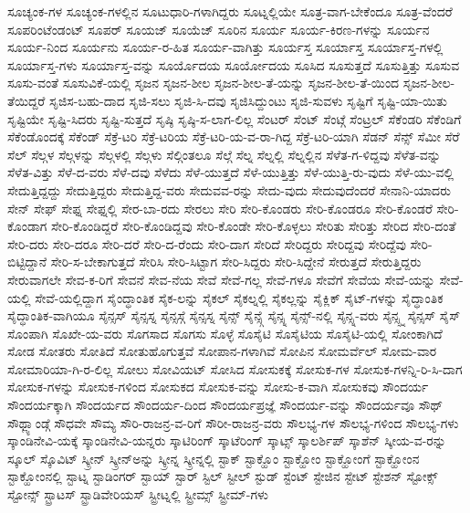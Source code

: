 {ಸೂಚ್ಯಂಕ-ಗಳ
ಸೂಚ್ಯಂಕ-ಗಳಲ್ಲಿನ
ಸೂಟುಧಾರಿ-ಗಳಾಗಿದ್ದರು
ಸೂಟ್ನಲ್ಲಿಯೇ
ಸೂತ್ರ-ವಾಗ-ಬೇಕೆಂದೂ
ಸೂತ್ರ-ವೆಂದರೆ
ಸೂಪರಿಂಟೆಂಡಂಟ್
ಸೂಪರ್
ಸೂಯಜ್
ಸೂಯೆಜ್
ಸೂರಿನ
ಸೂರ್ಯ
ಸೂರ್ಯ-ಕಿರಣ-ಗಳನ್ನು
ಸೂರ್ಯನ
ಸೂರ್ಯ-ನಿಂದ
ಸೂರ್ಯನು
ಸೂರ್ಯ-ರ-ಹಿತ
ಸೂರ್ಯ-ವಾಗಿತ್ತು
ಸೂರ್ಯಸ್ತ
ಸೂರ್ಯಾಸ್ತ
ಸೂರ್ಯಾಸ್ತ-ಗಳಲ್ಲಿ
ಸೂರ್ಯಾಸ್ತ-ಗಳು
ಸೂರ್ಯಾಸ್ತ-ವನ್ನು
ಸೂರ್ಯೊದಯ
ಸೂರ್ಯೋದಯ
ಸೂಸಿದ
ಸೂಸುತ್ತದೆ
ಸೂಸುತ್ತಿತ್ತು
ಸೂಸುವ
ಸೂಸು-ವಂತೆ
ಸೂಸುವಿಕೆ-ಯಲ್ಲಿ
ಸೃಜನ
ಸೃಜನ-ಶೀಲ
ಸೃಜನ-ಶೀಲ-ತೆ-ಯನ್ನು
ಸೃಜನ-ಶೀಲ-ತೆ-ಯಿಂದ
ಸೃಜನ-ಶೀಲ-ತೆಯಿದ್ದರೆ
ಸೃಜಿಸ-ಬಹು-ದಾದ
ಸೃಜಿ-ಸಲು
ಸೃಜಿ-ಸಿ-ದವು
ಸೃಜಿಸಿದ್ದುಂಟು
ಸೃಜಿ-ಸುವಳು
ಸೃಷ್ಟಿಗೆ
ಸೃಷ್ಟಿ-ಯಾ-ಯಿತು
ಸೃಷ್ಟಿಯೇ
ಸೃಷ್ಟಿ-ಸಿದರು
ಸೃಷ್ಟಿ-ಸುತ್ತದೆ
ಸೃಷ್ಠಿ
ಸೃಷ್ಠಿ-ಸ-ಲಾಗ-ಲಿಲ್ಲ
ಸೆಂಟರ್
ಸೆಂಟ್
ಸೆಂಟ್ಗೆ
ಸೆಂಟ್ರಲ್
ಸೆಕೆಂಡರಿ
ಸೆಕೆಂಡಿಗೆ
ಸೆಕೆಂಡೊಂದಕ್ಕೆ
ಸೆಕೆಂಡ್
ಸೆಕ್ರೆ-ಟರಿ
ಸೆಕ್ರೆ-ಟರಿಯ
ಸೆಕ್ರೆ-ಟರಿ-ಯ-ವ-ರಾ-ಗಿದ್ದ
ಸೆಕ್ರೆ-ಟರಿ-ಯಾಗಿ
ಸೆಡನ್
ಸೆನ್ಸ್
ಸೆಮೀ
ಸೆರೆ
ಸೆಲ್
ಸೆಲ್ಗಳ
ಸೆಲ್ಗಳನ್ನು
ಸೆಲ್ಗಳಲ್ಲಿ
ಸೆಲ್ಗಳು
ಸೆಲ್ಗಿಂತಲೂ
ಸೆಲ್ಗೆ
ಸೆಲ್ನ
ಸೆಲ್ನಲ್ಲಿ
ಸೆಲ್ನಲ್ಲಿನ
ಸೆಳೆತ-ಗ-ಳಿದ್ದವು
ಸೆಳೆತ-ವನ್ನು
ಸೆಳೆತ-ವಿತ್ತು
ಸೆಳೆ-ದ-ವರು
ಸೆಳೆ-ದವು
ಸೆಳೆದು
ಸೆಳೆ-ಯುತ್ತದೆ
ಸೆಳೆ-ಯುತ್ತಿತ್ತು
ಸೆಳೆ-ಯುತ್ತಿ-ರು-ವುದು
ಸೆಳೆ-ಯು-ವಲ್ಲಿ
ಸೇದುತ್ತಿದ್ದದ್ದು
ಸೇದುತ್ತಿದ್ದರು
ಸೇದುತ್ತಿದ್ದ-ವರು
ಸೇದುವವ-ರನ್ನು
ಸೇದು-ವುದು
ಸೇದುವುದೆಂದರೆ
ಸೇನಾನಿ-ಯಾದರು
ಸೇನ್
ಸೇಫ್
ಸೇಫ್ನ
ಸೇಫ್ನಲ್ಲಿ
ಸೇರ-ಬಾ-ರದು
ಸೇರಲು
ಸೇರಿ
ಸೇರಿ-ಕೊಂಡರು
ಸೇರಿ-ಕೊಂಡರೂ
ಸೇರಿ-ಕೊಂಡರೆ
ಸೇರಿ-ಕೊಂಡಾಗ
ಸೇರಿ-ಕೊಂಡಿದ್ದರೆ
ಸೇರಿ-ಕೊಂಡಿದ್ದವು
ಸೇರಿ-ಕೊಂಡೇ
ಸೇರಿ-ಕೊಳ್ಳಲು
ಸೇರಿತು
ಸೇರಿತ್ತು
ಸೇರಿದ
ಸೇರಿ-ದಂತೆ
ಸೇರಿ-ದರು
ಸೇರಿ-ದರೂ
ಸೇರಿ-ದರೆ
ಸೇರಿ-ದ-ರೆಂದು
ಸೇರಿ-ದಾಗ
ಸೇರಿದೆ
ಸೇರಿದ್ದರು
ಸೇರಿದ್ದವು
ಸೇರಿದ್ದೆವು
ಸೇರಿ-ಬಿಟ್ಟಿದ್ದಾನೆ
ಸೇರಿ-ಸ-ಬೇಕಾಗುತ್ತದೆ
ಸೇರಿಸಿ
ಸೇರಿ-ಸಿಟ್ಟಾಗ
ಸೇರಿ-ಸಿದ್ದರು
ಸೇರಿ-ಸಿದ್ದೇನೆ
ಸೇರುತ್ತದೆ
ಸೇರುತ್ತಿದ್ದರು
ಸೇರುವಾಗಲೇ
ಸೇವ-ಕ-ರಿಗೆ
ಸೇವನೆ
ಸೇವ-ನೆಯ
ಸೇವೆ
ಸೇವೆ-ಗಲ್ಲ
ಸೇವೆ-ಗಳೂ
ಸೇವೆಗೆ
ಸೇವೆಯ
ಸೇವೆ-ಯನ್ನು
ಸೇವೆ-ಯಲ್ಲಿ
ಸೇವೆ-ಯಲ್ಲಿದ್ದಾಗ
ಸೈಂದ್ಧಾಂತಿಕ
ಸೈಕ-ಲನ್ನು
ಸೈಕಲ್
ಸೈಕಲ್ನಲ್ಲಿ
ಸೈಕಲ್ಲನ್ನು
ಸೈಕ್ಲಿಕ್
ಸೈಟ್-ಗಳನ್ನು
ಸೈದ್ಧಾಂತಿಕ
ಸೈದ್ಧಾಂತಿಕ-ವಾಗಿಯೂ
ಸೈನ್ಸಸ್
ಸೈನ್ಸಸ್ನ
ಸೈನ್ಸಸ್ಗೆ
ಸೈನ್ಸಸ್ನ
ಸೈನ್ಸ್
ಸೈನ್ಸ್ಗೆ
ಸೈನ್ಸ್ನ
ಸೈನ್ಸ್-ನಲ್ಲಿ
ಸೈನ್ಸ್ನ-ವರು
ಸೈನ್ಸ್ಸ್ನ
ಸೈನ್ಸಸ್
ಸೈಸ್
ಸೊಂಪಾಗಿ
ಸೊಖೇ-ಯ-ವರು
ಸೊಗಸಾದ
ಸೊಗಸು
ಸೊಳ್ಳೆ
ಸೊಸೈಟಿ
ಸೊಸೈಟಿಯ
ಸೊಸೈಟಿ-ಯಲ್ಲಿ
ಸೋಂಕಾಗಿದೆ
ಸೋಡ
ಸೋತರು
ಸೋತಿದೆ
ಸೋತುಹೊಗುತ್ತವೆ
ಸೋಪಾನ-ಗಳಾಗಿವೆ
ಸೋಪಿನ
ಸೋಮರ್ವೆಲ್
ಸೋಮ-ವಾರ
ಸೋಮಾರಿಯಾ-ಗಿ-ರ-ಲಿಲ್ಲ
ಸೋಲು
ಸೋವಿಯಟ್
ಸೋಸಿದ
ಸೋಸುಕಕ್ಕೆ
ಸೋಸುಕ-ಗಳ
ಸೋಸುಕ-ಗಳನ್ನಿ-ರಿ-ಸಿ-ದಾಗ
ಸೋಸುಕ-ಗಳನ್ನು
ಸೋಸುಕ-ಗಳಿಂದ
ಸೋಸುಕದ
ಸೋಸುಕ-ವನ್ನು
ಸೋಸು-ಕ-ವಾಗಿ
ಸೋಸುಕವು
ಸೌಂದರ್ಯ
ಸೌಂದರ್ಯಕ್ಕಾಗಿ
ಸೌಂದರ್ಯದ
ಸೌಂದರ್ಯ-ದಿಂದ
ಸೌಂದರ್ಯಪ್ರಜ್ಞೆ
ಸೌಂದರ್ಯ-ವನ್ನು
ಸೌಂದರ್ಯವೂ
ಸೌಥ್
ಸೌಥ್ಲ್ಯಾಂಡ್ಗೆ
ಸೌಧವೇ
ಸೌಮ್ಯ
ಸೌರಿ-ರಾಜನ್ರ-ವ-ರಿಗೆ
ಸೌರೀ-ರಾಜನ್ರ-ವರು
ಸೌಲಭ್ಯ-ಗಳ
ಸೌಲಭ್ಯ-ಗಳಿಂದ
ಸೌಲಭ್ಯ-ಗಳು
ಸ್ಕಾಂಡಿನೇವಿ-ಯಕ್ಕೆ
ಸ್ಕಾಂಡಿನೇವಿ-ಯನ್ನರು
ಸ್ಕಾಟಿರಿಂಗ್
ಸ್ಕಾಟೆರಿಂಗ್
ಸ್ಕಾಟ್ಸ್
ಸ್ಕಾಲರ್ಶಿಪ್
ಸ್ಕಾಶೆನ್
ಸ್ಕೀಯ-ವ-ರನ್ನು
ಸ್ಕೂಲ್
ಸ್ಕೊವಿಟ್
ಸ್ಕ್ರೀನ್
ಸ್ಕ್ರೀನ್ಅನ್ನು
ಸ್ಕ್ರೀನ್ನ
ಸ್ಕ್ರೀನ್ನಲ್ಲಿ
ಸ್ಟಾಕ್
ಸ್ಟಾಕ್ಹೊಂ
ಸ್ಟಾಕ್ಹೋಂ
ಸ್ಟಾಕ್ಹೋಂಗೆ
ಸ್ಟಾಕ್ಹೋಂನ
ಸ್ಟಾಕ್ಹೋಂನಲ್ಲಿ
ಸ್ಟಾಟ್ನ
ಸ್ಟಾಡಿಂಗರ್
ಸ್ಟಾಯ್
ಸ್ಟಾರ್
ಸ್ಟಿಲ್
ಸ್ಟೀಲ್
ಸ್ಟುಡ್
ಸ್ಟೆಂಟ್
ಸ್ಟೇಜಿನ
ಸ್ಟೇಟ್
ಸ್ಟೇಶನ್
ಸ್ಟೋಕ್ಸ್
ಸ್ಟೋನ್ಸ್
ಸ್ಟ್ರಾಟಸ್
ಸ್ಟ್ರಾಡಿವೇರಿಯಸ್
ಸ್ಟ್ರೀಟ್ನಲ್ಲಿ
ಸ್ಟ್ರೀಮ್ಸ್
ಸ್ಟ್ರೀಮ್-ಗಳು
}
